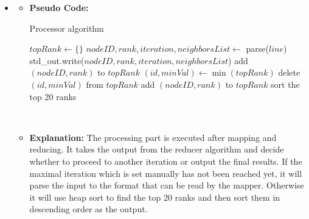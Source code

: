 \begin{itemize}
    \item {}
    \begin{itemize}
    \item \textbf{Pseudo Code:}\\
        \begin{minipage}{\linewidth}
        \begin{algorithm}[H]
        \caption{Processor algorithm}\label{process}
        \begin{algorithmic}[1]
        \State $topRank \gets \{\} $
        \State $nodeID, rank, iteration, neighborsList \gets$ parse($line$)
            \State std\_out.write($nodeID, rank, iteration, neighborsList$)
        \Else
                \State add $(nodeID, rank)$ to $topRank$
            \EndWhile
            \State $(id, minVal) \gets \min(topRank)$
                \State delete $(id, minVal)$ from $topRank$
                \State add $(nodeID, rank)$ to $topRank$
            \EndIf
        \EndIf
        \EndFor
        \State sort the top 20 ranks
        \EndProcedure
        \end{algorithmic}
        \end{algorithm}
        \end{minipage} \\[1em]
    
    \item \textbf{Explanation:} The processing part is executed after mapping and reducing. It takes the output from the reducer algorithm and decide whether to proceed to another iteration or output the final results. If the maximal iteration which is set manually has not been reached yet, it will parse the input to the format that can be read by the mapper. Otherwise it will use heap sort to find the top 20 ranks and then sort them in descending order as the output.
    \end{itemize}

\end{itemize}



